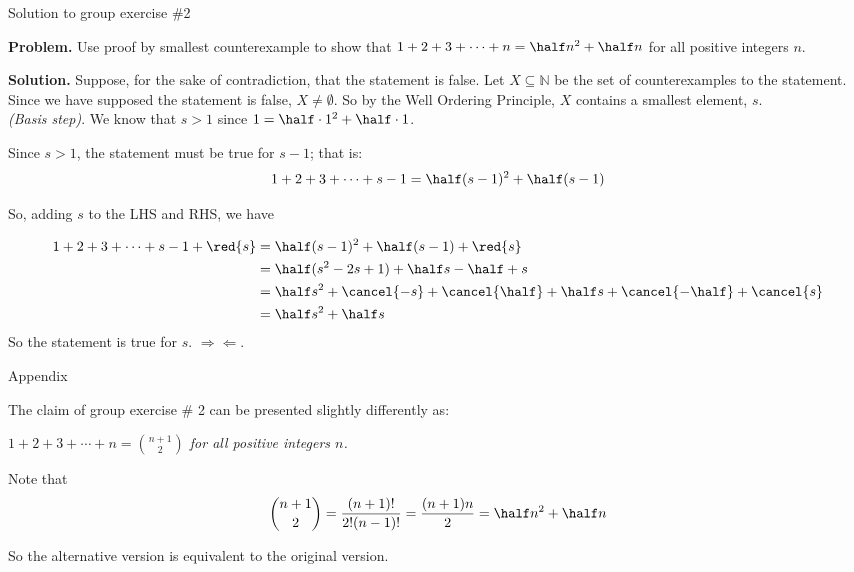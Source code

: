 \documentclass[10pt]{beamer}
\newcommand{\leastElement}{s}
\begin{document}
\begin{frame}{Solution to group exercise \#2}
\footnotesize  

\colorbox{red!30}{\textbf{Problem.}}  Use proof by smallest counterexample to show that $1+2+3+ \cdots + n = \half n^2 + \half n$ for all positive integers $n$.

\vfill 
\colorbox{green!30}{\textbf{Solution.}}  Suppose, for the sake of contradiction, that the statement is false.  Let $X \subseteq \mathbb{N}$ be the set of counterexamples to the statement.   Since we have supposed the statement is false, $X \neq \emptyset$.  So by the Well Ordering Principle, $X$ contains a smallest element, $\leastElement$.  \\
\vspace{.25cm}
\textit{(Basis step)}.  We know that $\leastElement > 1$ since $1 = \half \cdot 1^2 + \half \cdot 1$.   

Since $\leastElement>1$, the statement must be true for $\leastElement-1$; that is:
\[  1+2+3+ \cdots + \leastElement-1 = \half (s-1)^2 + \half (s-1) \] 

So, adding $s$ to the LHS and RHS, we have 

\begin{align*}
1+2+3+ \cdots + \leastElement-1 + \red{s}  &= \half (s-1)^2 + \half (s-1) + \red{s} \\
&= \half (s^2 - 2s + 1) + \half s - \half +s \\
&=\half s^2 + \cancel{-s} + \cancel{\half}  + \half s + \cancel{-\half} + \cancel{s} \\
&= \half s^2 + \half s 
\end{align*}
%
So the statement is true for $\leastElement$. \; $\Rightarrow\Leftarrow$.
\end{frame}

\begin{frame}[standout]
Appendix 
\end{frame}


\begin{frame}
\footnotesize 

\begin{mybluebox}[title=\text{Optional Remark About Group Exercise \#2}]
The claim of group exercise \# 2 can be presented slightly differently as:

\vspace{.5cm}

\begin{center}
\textit{$1+2+3+ \cdots + n = \binom{n+1}{2}$ for all positive integers $n$.}  
\end{center}

\vspace{.5cm}

Note that
\[\binom{n+1}{2} = \frac{(n+1)!}{2! (n-1)!} = \frac{(n+1)n }{2} = \half n^2 + \half n \]
 
\vspace{.5cm}
 
So the alternative version is equivalent to the original version.

\end{mybluebox}
\end{frame}
\end{document}
